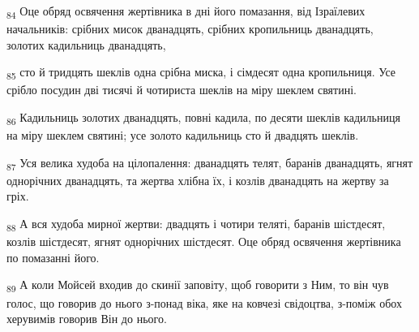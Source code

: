 \begin{tcolorbox}
\textsubscript{84} Оце обряд освячення жертівника в дні його помазання, від Ізраїлевих начальників: срібних мисок дванадцять, срібних кропильниць дванадцять, золотих кадильниць дванадцять,
\end{tcolorbox}
\begin{tcolorbox}
\textsubscript{85} сто й тридцять шеклів одна срібна миска, і сімдесят одна кропильниця. Усе срібло посудин дві тисячі й чотириста шеклів на міру шеклем святині.
\end{tcolorbox}
\begin{tcolorbox}
\textsubscript{86} Кадильниць золотих дванадцять, повні кадила, по десяти шеклів кадильниця на міру шеклем святині; усе золото кадильниць сто й двадцять шеклів.
\end{tcolorbox}
\begin{tcolorbox}
\textsubscript{87} Уся велика худоба на цілопалення: дванадцять телят, баранів дванадцять, ягнят однорічних дванадцять, та жертва хлібна їх, і козлів дванадцять на жертву за гріх.
\end{tcolorbox}
\begin{tcolorbox}
\textsubscript{88} А вся худоба мирної жертви: двадцять і чотири теляті, баранів шістдесят, козлів шістдесят, ягнят однорічних шістдесят. Оце обряд освячення жертівника по помазанні його.
\end{tcolorbox}
\begin{tcolorbox}
\textsubscript{89} А коли Мойсей входив до скинії заповіту, щоб говорити з Ним, то він чув голос, що говорив до нього з-понад віка, яке на ковчезі свідоцтва, з-поміж обох херувимів говорив Він до нього.
\end{tcolorbox}
